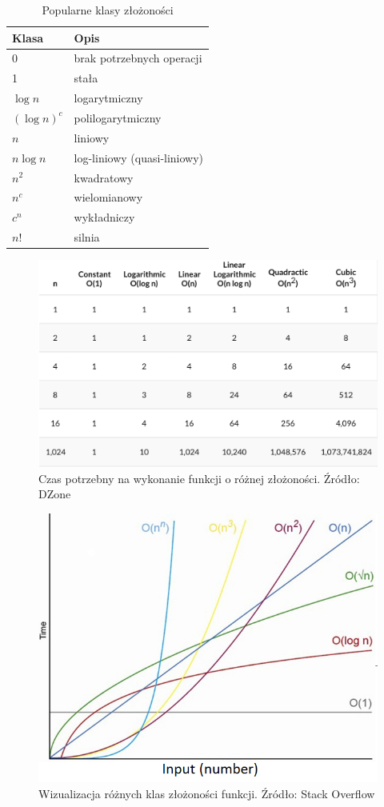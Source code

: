 \documentclass[10pt, oneside]{article}
\theoremstyle{remark}
\begin{document}
\begin{table}[]
\caption{Popularne klasy złożoności}
\centering
\begin{tabular}{@{}ll@{}}
\toprule
Klasa & Opis \\ \midrule
0 & brak potrzebnych operacji \\
1 & stała \\
$\log n$ & logarytmiczny \\
$(\log n)^c$ & polilogarytmiczny \\
$n$ & liniowy \\
$n \log n$ & log-liniowy (quasi-liniowy) \\
$n^2$ & kwadratowy \\
$n^c$ & wielomianowy \\
$c^n$ & wykładniczy \\
$n!$ & silnia \\ \bottomrule
\end{tabular}
\end{table}

\begin{figure}
	\centering
	\includegraphics[width=.5\textwidth]{figures/times}
	\caption{Czas potrzebny na wykonanie funkcji o różnej złożoności. Źródło: DZone}
\end{figure}

\begin{figure}
	\centering
	\includegraphics[width=.5\textwidth]{figures/complexities}
	\caption{Wizualizacja różnych klas złożoności funkcji. Źródło: Stack Overflow}
\end{figure}
\end{document}
